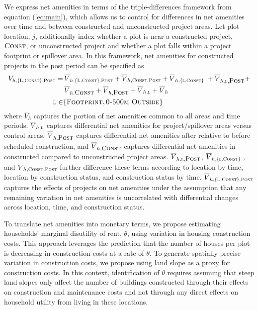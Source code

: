 \documentclass[12pt]{article}
\begin{document}
We express net amenities in terms of the triple-differences framework from equation (\ref{eq:main}), which allows us to control for differences in net amenities over time and between constructed and unconstructed project areas.  Let plot location, $j$, additionally index whether a plot is near a constructed project, $\textsc{Const}$, or unconstructed project and whether a plot falls within a project footprint or spillover area.  In this framework, net amenities for constructed projects in the post period can be specified as 
\begin{align}
\label{eq:netamenities}
\begin{split}
V_{h,\textsc{\{L,Const\},Post}} =& \, \overline{V}_{h,\textsc{\{L,Const\},Post}} + \overline{V}_{h,\textsc{Const,Post}} + \overline{V}_{h,\textsc{\{l,Const\} }}  + \overline{V}_{h,\textsc{l},\textsc{\small Post}} + \\
&\, \overline{V}_{h,\textsc{\small Const}}+ \overline{V}_{h,\textsc{\small Post}} + \overline{V}_{h,\textsc{l}}  + \overline{V}_h \\
\textsc{l} \in& \{\textsc{Footprint},\textsc{0-500m Outside}\}
\end{split}
\end{align}
\noindent where $\overline{V}_h$ captures the portion of net amenities common to all areas and time periods.   $\overline{V}_{h,\textsc{l}} $  captures differential net amenities for project/spillover areas versus control areas, $\overline{V}_{h,\textsc{\small Post}} $ captures differential net amenities after relative to before scheduled construction, and $\overline{V}_{h,\textsc{\small Const}}$ captures differential net amenities in constructed compared to unconstructed project areas.  $\overline{V}_{h,\textsc{l},\textsc{\small Post}}$, $\overline{V}_{h,\textsc{\{l,Const\} }}$, and $\overline{V}_{h,\textsc{Const,Post}} $ further difference these terms according to location by time, location by construction status, and construction status by time.  $\overline{V}_{h,\textsc{\{L,Const\},Post}}$ captures the effects of projects on net amenities under the assumption that any remaining variation in net amenities is uncorrelated with differential changes across location, time, and construction status. 

To translate net amenities into monetary terms, we propose estimating households' marginal disutility of rent, $\theta$, using variation in housing construction costs.  This approach leverages the prediction that the number of houses per plot is decreasing in construction costs at a rate of $\theta$.  To generate spatially precise variation in construction costs, we propose using land slope as a proxy for construction costs.  In this context, identification of $\theta$ requires assuming that steep land slopes only affect the number of buildings constructed through their effects on construction and maintenance costs and not through any direct effects on household utility from living in these locations.    
\end{document}
